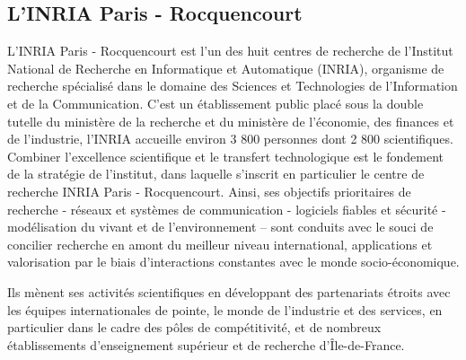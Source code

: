 	\subsection{L'INRIA Paris - Rocquencourt}
	L’INRIA Paris - Rocquencourt est l'un des huit centres de recherche de l’Institut National de Recherche en Informatique et Automatique (INRIA), organisme de recherche spécialisé dans le domaine des Sciences et Technologies de l’Information et de la Communication. C'est un établissement public placé sous la double tutelle du ministère de la recherche et du ministère de l’économie, des finances et de l’industrie, l'INRIA accueille environ 3 800 personnes dont 2 800 scientifiques. 
	Combiner l’excellence scientifique et le transfert technologique est le fondement de la stratégie de l’institut, dans laquelle s’inscrit en particulier le centre de recherche INRIA Paris - Rocquencourt. Ainsi, ses objectifs prioritaires de recherche - réseaux et systèmes de communication - logiciels fiables et sécurité - modélisation du vivant et de l'environnement – sont conduits avec le souci de concilier recherche en amont du meilleur niveau international, applications et valorisation par le biais d’interactions constantes avec le monde socio-économique.

Ils mènent ses activités scientifiques en développant des partenariats étroits avec les équipes internationales de pointe, le monde de l’industrie et des services, en particulier dans le cadre des pôles de compétitivité, et de nombreux établissements d’enseignement supérieur et de recherche d’Île-de-France.
	
